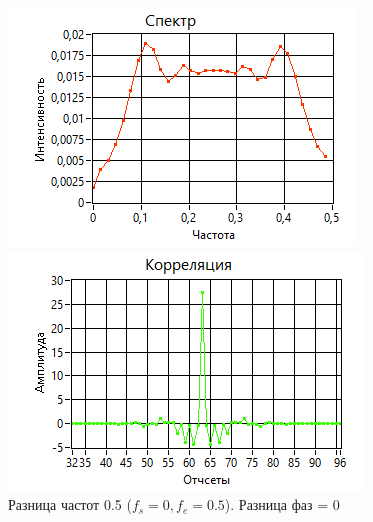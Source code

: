 \begin{figure}[H]
    \centering
    \begin{minipage}{0.49\linewidth}
        \includegraphics[width =0.9\linewidth]{imgs/spec1.png}
    \end{minipage}
    \begin{minipage}{0.49\linewidth}
        \includegraphics[width =0.9\linewidth]{imgs/corr1.png}
    \end{minipage}
	\caption{Разница частот 0.5 ($f_{s}=0, f_{e}=0.5$). Разница фаз = 0}
	\label{fig:spec1}
\end{figure}

